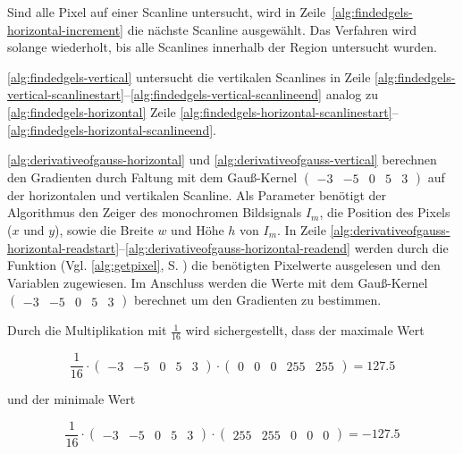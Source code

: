 Sind alle Pixel auf einer Scanline untersucht, wird in Zeile~\ref{alg:findedgels-horizontal-increment} die nächste
 Scanline ausgewählt. Das Verfahren wird solange wiederholt, bis alle Scanlines innerhalb der Region untersucht wurden.

\autoref{alg:findedgels-vertical} untersucht die vertikalen Scanlines in Zeile
 \ref{alg:findedgels-vertical-scanlinestart}--\ref{alg:findedgels-vertical-scanlineend} analog zu
 \autoref{alg:findedgels-horizontal} Zeile
 \ref{alg:findedgels-horizontal-scanlinestart}--\ref{alg:findedgels-horizontal-scanlineend}.

\autoref{alg:derivativeofgauss-horizontal} und \autoref{alg:derivativeofgauss-vertical} berechnen den Gradienten durch Faltung mit dem Gauß-Kernel
$\left( \begin{smallmatrix}
-3& -5& 0& 5& 3
\end{smallmatrix} \right)$
 auf der horizontalen und vertikalen Scanline. Als Parameter benötigt der Algorithmus den Zeiger des monochromen
 Bildsignals $I_m$, die Position des Pixels ($x$ und $y$), sowie die Breite $w$ und Höhe $h$ von $I_m$. In Zeile
 \ref{alg:derivativeofgauss-horizontal-readstart}--\ref{alg:derivativeofgauss-horizontal-readend} werden durch die
 Funktion  (Vgl. \autoref{alg:getpixel}, S. \pageref{alg:getpixel}) die benötigten Pixelwerte
 ausgelesen und den Variablen zugewiesen. Im Anschluss werden die Werte mit dem Gauß-Kernel
$\left( \begin{smallmatrix}
-3& -5& 0& 5& 3
\end{smallmatrix} \right)$
berechnet um den Gradienten zu bestimmen.



Durch die Multiplikation mit $\tfrac{1}{16}$ wird sichergestellt, dass der maximale Wert

\begin{equation}
	\frac{1}{16}
	\cdot
	\begin{pmatrix}
		-3& -5& 0& 5& 3
	\end{pmatrix}
	\cdot
	\begin{pmatrix}
		0& 0& 0& 255& 255
	\end{pmatrix}
	= 127.5
\end{equation}

und der minimale Wert

\begin{equation}
	\frac{1}{16}
	\cdot
	\begin{pmatrix}
		-3& -5& 0& 5& 3
	\end{pmatrix}
	\cdot
	\begin{pmatrix}
		255& 255& 0& 0& 0
	\end{pmatrix}
	= -127.5
\end{equation}


